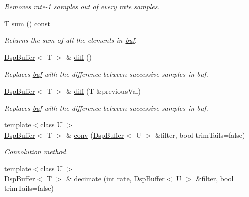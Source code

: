 \begin{DoxyCompactItemize}
\begin{DoxyCompactList}\small\item\em Removes rate-\/1 samples out of every rate samples. \end{DoxyCompactList}\item 
T \hyperlink{class_smart_dsp_1_1_dsp_buffer_af88400d0ec92e4826a364a49ab103433}{sum} () const 
\begin{DoxyCompactList}\small\item\em Returns the sum of all the elements in \hyperlink{class_smart_dsp_1_1_dsp_buffer_a7abb8184e08f4c9762f66bc75dcd3a6a}{buf}. \end{DoxyCompactList}\item 
\hyperlink{class_smart_dsp_1_1_dsp_buffer}{Dsp\+Buffer}$<$ T $>$ \& \hyperlink{class_smart_dsp_1_1_dsp_buffer_a7f9df0331d7e7caafb26c44654f3b07e}{diff} ()
\begin{DoxyCompactList}\small\item\em Replaces \hyperlink{class_smart_dsp_1_1_dsp_buffer_a7abb8184e08f4c9762f66bc75dcd3a6a}{buf} with the difference between successive samples in buf. \end{DoxyCompactList}\item 
\hyperlink{class_smart_dsp_1_1_dsp_buffer}{Dsp\+Buffer}$<$ T $>$ \& \hyperlink{class_smart_dsp_1_1_dsp_buffer_a33d4c84d5be12617fb3230a8ae36cdf9}{diff} (T \&previous\+Val)
\begin{DoxyCompactList}\small\item\em Replaces \hyperlink{class_smart_dsp_1_1_dsp_buffer_a7abb8184e08f4c9762f66bc75dcd3a6a}{buf} with the difference between successive samples in buf. \end{DoxyCompactList}\item 
{\footnotesize template$<$class U $>$ }\\\hyperlink{class_smart_dsp_1_1_dsp_buffer}{Dsp\+Buffer}$<$ T $>$ \& \hyperlink{class_smart_dsp_1_1_dsp_buffer_a507f2f011d27343cf6767b5c1c8c7c34}{conv} (\hyperlink{class_smart_dsp_1_1_dsp_buffer}{Dsp\+Buffer}$<$ U $>$ \&filter, bool trim\+Tails=false)
\begin{DoxyCompactList}\small\item\em Convolution method. \end{DoxyCompactList}\item 
{\footnotesize template$<$class U $>$ }\\\hyperlink{class_smart_dsp_1_1_dsp_buffer}{Dsp\+Buffer}$<$ T $>$ \& \hyperlink{class_smart_dsp_1_1_dsp_buffer_a80cec364bb015eda96e7ce4e930abe7c}{decimate} (int rate, \hyperlink{class_smart_dsp_1_1_dsp_buffer}{Dsp\+Buffer}$<$ U $>$ \&filter, bool trim\+Tails=false)

\end{DoxyCompactItemize}
